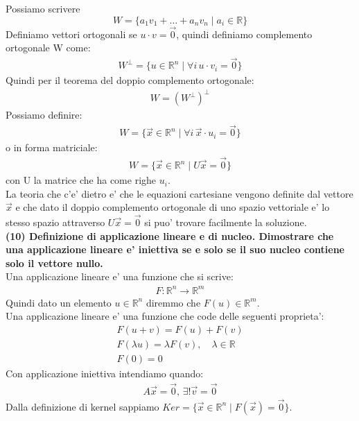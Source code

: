 \documentclass[10pt]{extarticle}
\begin{document}
Possiamo scrivere
\[
    W = \{a_1v_1+\dots+a_nv_n \mid a_i \in \mathbb{R}\}
\]
Definiamo vettori ortogonali se $u \cdot v = \vec{0}$, quindi definiamo complemento ortogonale W come:
\begin{align*}
    W^\bot = \{u \in \mathbb{R}^n \mid \forall i \, u \cdot v_i = \vec{0}\}
\end{align*}
Quindi per il teorema del doppio complemento ortogonale:
\begin{align*}
    W = (W^\bot)^\bot
\end{align*}
Possiamo definire:
\begin{align*}
    W = \{\vec{x} \in \mathbb{R}^n \mid \forall i \,\vec{x} \cdot u_i = \vec{0}\}
\end{align*}
o in forma matriciale:
\begin{align*}
    W = \{\vec{x} \in \mathbb{R}^n \mid U\vec{x}=\vec{0}\}
\end{align*}
con U la matrice che ha come righe $u_i$. \\
La teoria che c'e' dietro e' che le equazioni cartesiane vengono definite dal vettore $\vec{x}$ e che dato il doppio complemento ortogonale di uno spazio vettoriale e' lo stesso spazio attraverso $U\vec{x}=\vec{0}$ si puo' trovare facilmente la soluzione.
\vspace{1em}\\
\textbf{(10) Definizione di applicazione lineare e di nucleo. Dimostrare che una applicazione lineare e'
iniettiva se e solo se il suo nucleo contiene solo il vettore nullo.}\\
Una applicazione lineare e' una funzione che si scrive:
\begin{align*}
    F : \mathbb{R}^n \to \mathbb{R}^m
\end{align*}
Quindi dato un elemento $u \in \mathbb{R}^n$ diremmo che $F(u) \in \mathbb{R}^m$. \\
Una applicazione lineare e' una funzione che code delle seguenti proprieta':
\begin{align*}
    F(u+v)=F(u)+F(v) \\
    F(\lambda u)=\lambda F(v), \quad \lambda \in \mathbb{R} \\
    F(0)=0
\end{align*}
Con applicazione iniettiva intendiamo quando:
\begin{align*}
    A\vec{x}=\vec{0}, \, \exists! \vec{v}=\vec{0}
\end{align*}
Dalla definizione di kernel sappiamo $Ker=\{\vec{x} \in \mathbb{R}^n \mid F(\vec{x})=\vec{0}\}$.\\
\end{document}
